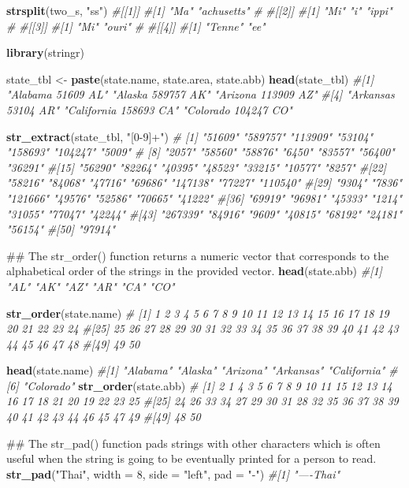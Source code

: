 \documentclass[]{book}
\newenvironment{Shaded}{\begin{snugshade}}{\end{snugshade}}
\newcommand{\KeywordTok}[1]{\textcolor[rgb]{0.13,0.29,0.53}{\textbf{#1}}}
\newcommand{\DataTypeTok}[1]{\textcolor[rgb]{0.13,0.29,0.53}{#1}}
\newcommand{\DecValTok}[1]{\textcolor[rgb]{0.00,0.00,0.81}{#1}}
\newcommand{\StringTok}[1]{\textcolor[rgb]{0.31,0.60,0.02}{#1}}
\newcommand{\CommentTok}[1]{\textcolor[rgb]{0.56,0.35,0.01}{\textit{#1}}}
\newcommand{\NormalTok}[1]{#1}
\begin{document}
\begin{Shaded}
\begin{Highlighting}[]
\KeywordTok{strsplit}\NormalTok{(two_s, }\StringTok{"ss"}\NormalTok{)}
\CommentTok{#[[1]]}
\CommentTok{#[1] "Ma"        "achusetts"}
\CommentTok{#}
\CommentTok{#[[2]]}
\CommentTok{#[1] "Mi"   "i"    "ippi"}
\CommentTok{#}
\CommentTok{#[[3]]}
\CommentTok{#[1] "Mi"   "ouri"}
\CommentTok{#}
\CommentTok{#[[4]]}
\CommentTok{#[1] "Tenne" "ee"}

\KeywordTok{library}\NormalTok{(stringr)}

\NormalTok{state_tbl <-}\StringTok{ }\KeywordTok{paste}\NormalTok{(state.name, state.area, state.abb)}
\KeywordTok{head}\NormalTok{(state_tbl)}
\CommentTok{#[1] "Alabama 51609 AL"     "Alaska 589757 AK"     "Arizona 113909 AZ"   }
\CommentTok{#[4] "Arkansas 53104 AR"    "California 158693 CA" "Colorado 104247 CO"  }

\KeywordTok{str_extract}\NormalTok{(state_tbl, }\StringTok{"[0-9]+"}\NormalTok{)}
\CommentTok{# [1] "51609"  "589757" "113909" "53104"  "158693" "104247" "5009"  }
\CommentTok{# [8] "2057"   "58560"  "58876"  "6450"   "83557"  "56400"  "36291" }
\CommentTok{#[15] "56290"  "82264"  "40395"  "48523"  "33215"  "10577"  "8257"  }
\CommentTok{#[22] "58216"  "84068"  "47716"  "69686"  "147138" "77227"  "110540"}
\CommentTok{#[29] "9304"   "7836"   "121666" "49576"  "52586"  "70665"  "41222" }
\CommentTok{#[36] "69919"  "96981"  "45333"  "1214"   "31055"  "77047"  "42244" }
\CommentTok{#[43] "267339" "84916"  "9609"   "40815"  "68192"  "24181"  "56154" }
\CommentTok{#[50] "97914"}

\NormalTok{## The str_order() function returns a numeric vector that corresponds to the alphabetical order of the strings in the provided vector.}
\KeywordTok{head}\NormalTok{(state.abb)}
\CommentTok{#[1] "AL" "AK" "AZ" "AR" "CA" "CO"}

\KeywordTok{str_order}\NormalTok{(state.name)}
\CommentTok{# [1]  1  2  3  4  5  6  7  8  9 10 11 12 13 14 15 16 17 18 19 20 21 22 23 24}
\CommentTok{#[25] 25 26 27 28 29 30 31 32 33 34 35 36 37 38 39 40 41 42 43 44 45 46 47 48}
\CommentTok{#[49] 49 50}

\KeywordTok{head}\NormalTok{(state.name)}
\CommentTok{#[1] "Alabama"    "Alaska"     "Arizona"    "Arkansas"   "California"}
\CommentTok{#[6] "Colorado"}
\KeywordTok{str_order}\NormalTok{(state.abb)}
\CommentTok{# [1]  2  1  4  3  5  6  7  8  9 10 11 15 12 13 14 16 17 18 21 20 19 22 23 25}
\CommentTok{#[25] 24 26 33 34 27 29 30 31 28 32 35 36 37 38 39 40 41 42 43 44 46 45 47 49}
\CommentTok{#[49] 48 50}

\NormalTok{## The str_pad() function pads strings with other characters which is often useful when the string is going to be eventually printed for a person to read.}
\KeywordTok{str_pad}\NormalTok{(}\StringTok{"Thai"}\NormalTok{, }\DataTypeTok{width =} \DecValTok{8}\NormalTok{, }\DataTypeTok{side =} \StringTok{"left"}\NormalTok{, }\DataTypeTok{pad =} \StringTok{"-"}\NormalTok{)}
\CommentTok{#[1] "----Thai"}


\end{Highlighting}
\end{Shaded}
\end{document}

